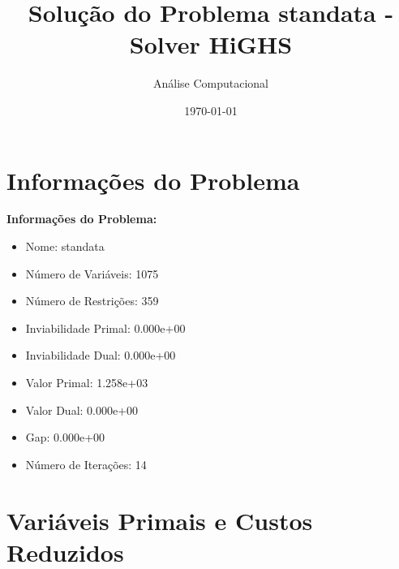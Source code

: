 \documentclass[12pt]{article}
\title{Solução do Problema standata - Solver HiGHS}
\author{Análise Computacional}
\date{\today}
\begin{document}
\maketitle

\section{Informações do Problema}

\textbf{Informações do Problema:}
\begin{itemize}
\item Nome: standata
\item Número de Variáveis: 1075
\item Número de Restrições: 359
\item Inviabilidade Primal: 0.000e+00
\item Inviabilidade Dual: 0.000e+00
\item Valor Primal: 1.258e+03
\item Valor Dual: 0.000e+00
\item Gap: 0.000e+00
\item Número de Iterações: 14
\end{itemize}


\section{Variáveis Primais e Custos Reduzidos}
\end{document}
